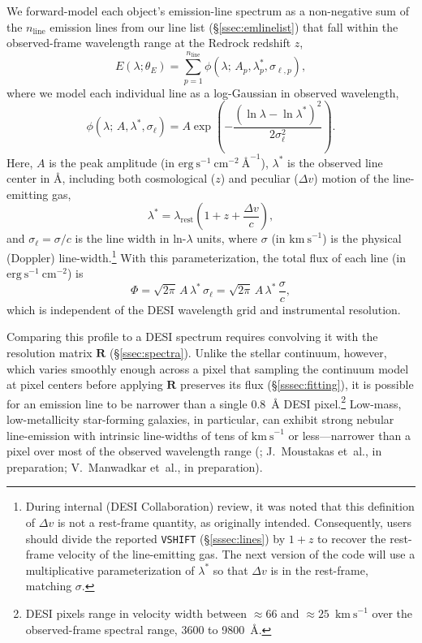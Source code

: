 \documentclass[modern,linenumbers]{aastex702}
\newcommand{\kms}{\ensuremath{\mathrm{km~s}^{-1}}}
\newcommand{\flux}{\ensuremath{\mathrm{erg~s}^{-1}~\mathrm{cm}^{-2}}}
\newcommand{\fluxdensity}{\ensuremath{\mathrm{erg~s}^{-1}~\mathrm{cm}^{-2}~\text{\AA}^{-1}}}
\begin{document}
We forward-model each object's emission-line spectrum as a
non-negative sum of the $n_\mathrm{line}$ emission lines from our line
list (\S\ref{ssec:emlinelist}) that fall within the observed-frame
wavelength range at the Redrock redshift $z$,
\begin{equation}
  E(\lambda;\theta_E) = \sum_{p=1}^{n_\mathrm{line}}
    \phi(\lambda;\,A_p,\lambda_p^*,\sigma_{\ell,p}),
  \label{eq:emline_sum}
\end{equation}
where we model each individual line as a log-Gaussian in observed
wavelength,
\begin{equation}
  \phi(\lambda;\,A,\lambda^*,\sigma_\ell)
  =
  A\exp\!\left(-\frac{(\ln\lambda - \ln\lambda^*)^{2}}{2\sigma_\ell^{2}}\right).
  \label{eq:intrinsic}
\end{equation}
Here, $A$ is the peak amplitude (in \fluxdensity), $\lambda^*$ is the
observed line center in \AA, including both cosmological ($z$) and
peculiar ($\Delta v$) motion of the line-emitting gas,
\begin{equation}
  \lambda^* = \lambda_\mathrm{rest}
    \left(1 + z + \frac{\Delta v}{c}\right),
  \label{eq:lstar}
\end{equation}
and $\sigma_\ell = \sigma/c$ is the line width in ln-$\lambda$ units,
where $\sigma$ (in \kms) is the physical (Doppler)
line-width.\footnote{During internal (DESI Collaboration)
  review, it was noted that this definition of $\Delta v$ is not a
  rest-frame quantity, as originally intended. Consequently, users
  should divide the reported \texttt{VSHIFT} (\S\ref{sssec:lines}) by
  $1+z$ to recover the rest-frame velocity of the line-emitting
  gas. The next version of the code will use a multiplicative
  parameterization of $\lambda^*$ so that $\Delta v$ is in the
  rest-frame, matching $\sigma$.}  With this parameterization, the
total flux of each line (in \flux) is
\begin{equation}
  \Phi = \sqrt{2\pi}\,A\,\lambda^*\,\sigma_\ell
       = \sqrt{2\pi}\,A\,\lambda^*\,\frac{\sigma}{c},
  \label{eq:flux_phys}
\end{equation}
which is independent of the DESI wavelength grid and instrumental
resolution.

Comparing this profile to a DESI spectrum requires convolving it with
the resolution matrix $\mathbf{R}$ (\S\ref{ssec:spectra}). Unlike the
stellar continuum, however, which varies smoothly enough across a
pixel that sampling the continuum model at pixel centers before
applying $\mathbf{R}$ preserves its flux (\S\ref{sssec:fitting}), it
is possible for an emission line to be narrower than a single
0.8~\AA{} DESI pixel.\footnote{DESI pixels range in velocity width
between $\approx66$ and $\approx25$~\kms{} over the observed-frame
spectral range, 3600 to 9800~\AA.} Low-mass, low-metallicity
star-forming galaxies, in particular, can exhibit strong nebular
line-emission with intrinsic line-widths of tens of \kms{} or
less---narrower than a pixel over most of the observed wavelength
range (\citealt{scholte26a}; J.~Moustakas et~al., in preparation;
V.~Manwadkar et~al., in preparation).
\end{document}
